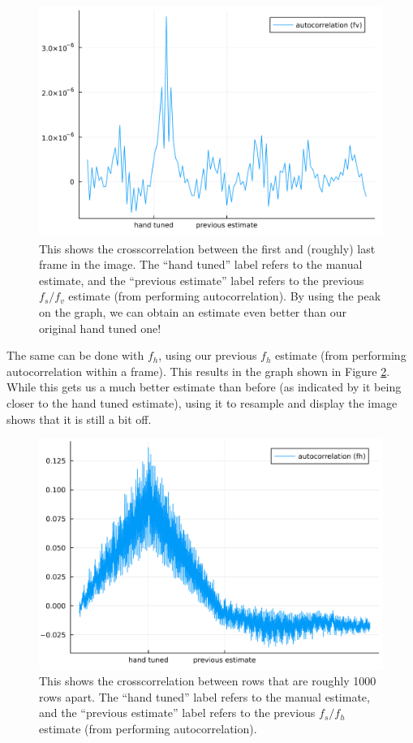 \documentclass{article}
\begin{document}
\begin{figure}
    \centering
    \includegraphics[width=0.92\linewidth]{images/autocor_fv_step2.png}
    \caption{This shows the crosscorrelation between the first and (roughly) last frame in the image. The ``hand tuned'' label refers to the manual estimate, and the ``previous estimate'' label refers to the previous $f_s/f_v$ estimate (from performing autocorrelation). By using the peak on the graph, we can obtain an estimate even better than our original hand tuned one!}
    \label{fig:xcorr-fv}
\end{figure}

The same can be done with $f_h$, using our previous $f_h$ estimate (from performing autocorrelation within a frame). This results in the graph shown in Figure \ref{fig:xcorr-fh}. While this gets us a much better estimate than before (as indicated by it being closer to the hand tuned estimate), using it to resample and display the image shows that it is still a bit off.
\begin{figure}
    \centering
    \includegraphics[width=0.92\linewidth]{images/autocor_fh_step2.png}
    \caption{This shows the crosscorrelation between rows that are roughly 1000 rows apart. The ``hand tuned'' label refers to the manual estimate, and the ``previous estimate'' label refers to the previous $f_s/f_h$ estimate (from performing autocorrelation).}
    \label{fig:xcorr-fh}
\end{figure}
\end{document}
